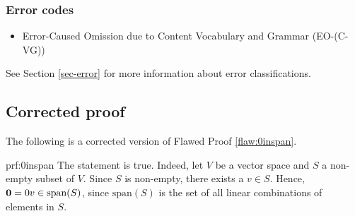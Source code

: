 \subsubsection{Error codes}
\begin{itemize}
    \item Error-Caused Omission due to Content Vocabulary and Grammar (EO-(C-VG))
\end{itemize}
See Section \ref{sec-error} for more information about error classifications.

\clearpage
\subsection{Corrected proof}

The following is a corrected version of Flawed Proof \ref{flaw:0inspan}. %

\begin{prf}{prf:0inspan} %
The statement is true. Indeed, let $V$ be a vector space and $S$ a non-empty subset of $V$. Since $S$ is non-empty, there exists a $v \in S$. Hence, ${\bf{0}} = 0v \in \text{span}(S)$, since $\text{span}(S)$ is the set of all linear combinations of elements in $S$.
\end{prf} 